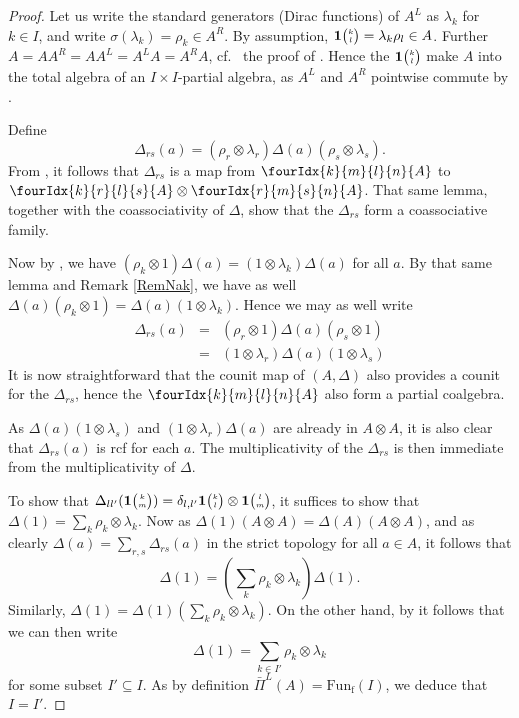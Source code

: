 \documentclass[11pt]{article}
\DeclareMathOperator{\fin}{\mathrm{f}}
\newcommand{\Fun}{\mathrm{Fun}}
\newcommand{\Grt}[3]{#1{\tiny {\begin{pmatrix} #2\\#3\end{pmatrix}}}}
\newcommand{\UnitC}[2]{\Grt{\mathbf{1}}{#1}{#2}}
\newcommand{\Gr}[5]{\fourIdx{#2}{#4}{#3}{#5}{#1}}%
\theoremstyle{definition}
\numberwithin{equation}{section}
\begin{document}
\begin{proof} Let us write the standard generators (Dirac functions) of $A^L$ as $\lambda_k$ for $k\in I$, and write $\sigma(\lambda_k) = \rho_k\in A^R$. By assumption, $\UnitC{k}{l} = \lambda_k\rho_l\in A$. Further $A= AA^R = AA^L = A^LA=A^RA$, cf.~ the proof of \cite[Theorem 3.13]{Boh1}. Hence the $\UnitC{k}{l}$ make $A$ into the total algebra of an $I\times I$-partial algebra, as $A^L$ and $A^R$ pointwise commute by \cite[Lemma 3.5]{Boh1}. 

Define \[\Delta_{rs}(a) = (\rho_r\otimes \lambda_r)\Delta(a)(\rho_s\otimes \lambda_s).\] From \cite[Lemma 3.3]{Boh1}, it follows that $\Delta_{rs}$ is a map from $\Gr{A}{k}{l}{m}{n}$ to $\Gr{A}{k}{l}{r}{s}\otimes \Gr{A}{r}{s}{m}{n}$. That same lemma, together with the coassociativity of $\Delta$, show that the $\Delta_{rs}$ form a coassociative family.  

Now by \cite[Lemma 3.9]{Boh1}, we have $(\rho_k\otimes 1)\Delta(a) = (1\otimes \lambda_k)\Delta(a)$ for all $a$. By that same lemma and Remark \ref{RemNak}, we have as well $\Delta(a)(\rho_k\otimes 1) = \Delta(a)(1\otimes \lambda_k)$. Hence we may as well write \begin{eqnarray*} \Delta_{rs}(a) &=& (\rho_r\otimes 1)\Delta(a)(\rho_s\otimes 1) \\ &=& (1\otimes \lambda_r)\Delta(a)(1\otimes \lambda_s)\end{eqnarray*}  It is now straightforward that the counit map of $(A,\Delta)$ also provides a counit for the $\Delta_{rs}$, hence the $\Gr{A}{k}{l}{m}{n}$ also form a partial coalgebra. 

As $\Delta(a)(1\otimes \lambda_s)$ and $(1\otimes \lambda_r)\Delta(a)$ are already in $A\otimes A$, it is also clear that $\Delta_{rs}(a)$ is rcf for each $a$. The multiplicativity of the $\Delta_{rs}$ is then immediate from the multiplicativity of $\Delta$.

To show that $\Delta_{ll'}(\UnitC{k}{m}) = \delta_{l,l'} \UnitC{k}{l}\otimes \UnitC{l}{m}$, it suffices to show that $\Delta(1) = \sum_k \rho_k\otimes \lambda_k$. Now as $\Delta(1)(A\otimes A)  = \Delta(A)(A\otimes A)$, and as clearly $\Delta(a) = \sum_{r,s}\Delta_{rs}(a)$ in the strict topology for all $a\in A$, it follows that \[\Delta(1) = \left(\sum_k \rho_k\otimes \lambda_k\right)\Delta(1).\]  Similarly, $\Delta(1) = \Delta(1)\left(\sum_k\rho_k\otimes \lambda_k\right)$. On the other hand, by \cite[Lemma 4.10]{Boh1} it follows that we can then write \[\Delta(1) = \sum_{k\in I'} \rho_k\otimes \lambda_k\] for some subset $I'\subseteq I$. As by definition $\bar{\Pi}^L(A) = \Fun_{\fin}(I)$, we deduce that $I=I'$. 


\end{proof}
\end{document}
